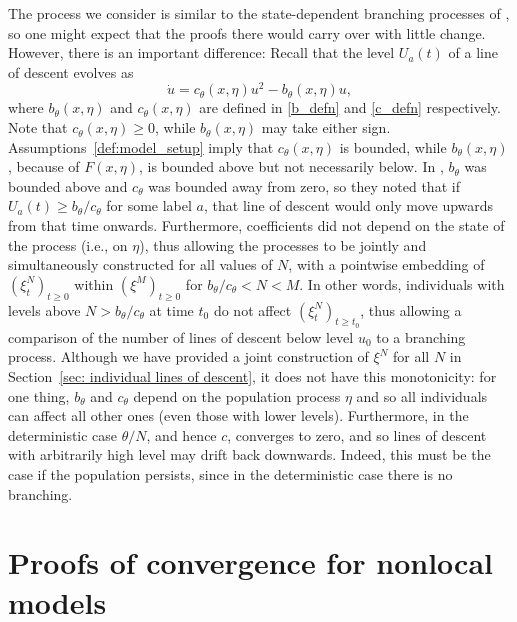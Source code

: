 \documentclass[EJP]{ejpecp} %
\newcommand{\lp}{\xi}              %
\newcommand{\citet}[1]{\cite{#1}}
\begin{document}
\begin{remark} \label{remark_on_branching}
The process we consider is similar to the state-dependent branching processes
of \citet{kurtz/rodrigues:2011}, so one might expect that the proofs there would carry over with little change.
However, there is an important difference:
Recall that the level $U_a(t)$ of a line of descent evolves as
\begin{equation} \label{eqn:u_evolution}
\dot u = c_\theta(x, \eta) u^2 - b_\theta(x, \eta) u,
\end{equation}
where $b_\theta(x, \eta)$ and $c_\theta(x, \eta)$ are defined in \eqref{b_defn}
and \eqref{c_defn} respectively.
Note that $c_\theta(x, \eta) \ge 0$, while $b_\theta(x, \eta)$ may take either sign.
Assumptions~\ref{def:model_setup} imply that $c_\theta(x, \eta)$ is bounded,
while $b_\theta(x, \eta)$, because of $F(x, \eta)$, is bounded above but not necessarily below.
In \citet{kurtz/rodrigues:2011}, $b_\theta$ was bounded above and $c_\theta$ was bounded away from zero,
so they noted that if $U_a(t) \ge b_\theta/c_\theta$ for some label $a$,
that line of descent would only move upwards from that time onwards.
Furthermore, coefficients did not depend on the state of the process (i.e., on $\eta$),
thus allowing the processes to be jointly and simultaneously constructed
for all values of $N$, with a pointwise embedding
of $(\lp^N_t)_{t \ge 0}$ within $(\lp^{M})_{t \ge 0}$ for $b_\theta/c_\theta < N < M$.
In other words, individuals with levels above $N > b_\theta/c_\theta$ at time $t_0$
do not affect $(\lp^N_t)_{t \ge t_0}$,
thus allowing a comparison of the number of lines of descent below level $u_0$
to a branching process.
Although we have provided a
joint construction of $\lp^N$ for all $N$ in Section~\ref{sec: individual lines of descent},
it does not have this monotonicity:
for one thing, $b_\theta$ and $c_\theta$ depend on the population process $\eta$
and so all individuals can affect all other ones (even those with lower levels).
Furthermore, in the deterministic case $\theta/N$, and hence $c$, converges to zero,
and so lines of descent with arbitrarily high level may drift back downwards.
Indeed, this must be the case if the population persists,
since in the deterministic case there is no branching.
\end{remark}


\section{Proofs of convergence for nonlocal models}
\label{sec:proofs}
\end{document}
